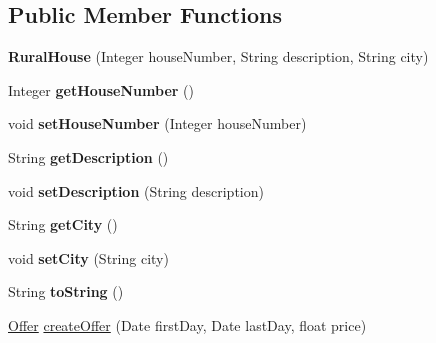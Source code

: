 \subsection*{Public Member Functions}
\begin{DoxyCompactItemize}
\item 
\mbox{\label{classdomain_1_1_rural_house_aed816133d8047632fa70f3f83758274d}} 
{\bfseries Rural\+House} (Integer house\+Number, String description, String city)
\item 
\mbox{\label{classdomain_1_1_rural_house_a849faba68dc8c0a71ed936bc509f5568}} 
Integer {\bfseries get\+House\+Number} ()
\item 
\mbox{\label{classdomain_1_1_rural_house_afae7f7702581e18517472b1faa29273d}} 
void {\bfseries set\+House\+Number} (Integer house\+Number)
\item 
\mbox{\label{classdomain_1_1_rural_house_a21b3359aa62984046a4da490fe8895e1}} 
String {\bfseries get\+Description} ()
\item 
\mbox{\label{classdomain_1_1_rural_house_aff9ad2c8f775b473256233e9c26456f1}} 
void {\bfseries set\+Description} (String description)
\item 
\mbox{\label{classdomain_1_1_rural_house_a67a45aa0b441b32d455d58c4a42446f1}} 
String {\bfseries get\+City} ()
\item 
\mbox{\label{classdomain_1_1_rural_house_a04f87e3266ab2b0d9b42bb8f947d6172}} 
void {\bfseries set\+City} (String city)
\item 
\mbox{\label{classdomain_1_1_rural_house_a2937650ac9e726b75be724d264fa1bee}} 
String {\bfseries to\+String} ()
\item 
\mbox{\hyperlink{classdomain_1_1_offer}{Offer}} \mbox{\hyperlink{classdomain_1_1_rural_house_a58e17e08a7b28a75bc1b8e3d6ac01764}{create\+Offer}} (Date first\+Day, Date last\+Day, float price)
\item 
\mbox{\label{classdomain_1_1_rural_house_a23272d170821f464d6b07595303c283e}} 

\end{DoxyCompactItemize}

